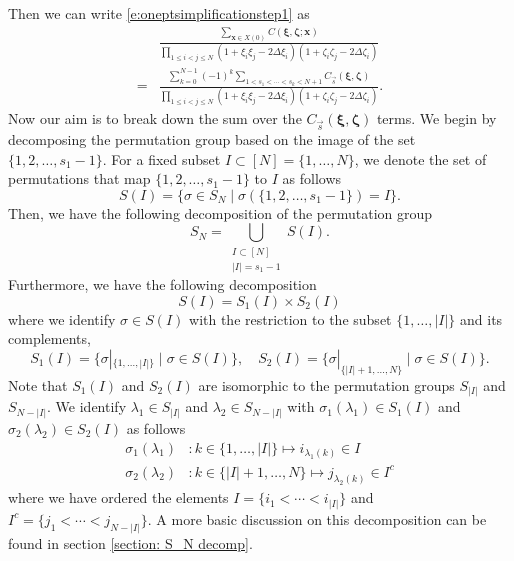 \documentclass[a4paper,11pt]{article}
\theoremstyle{definition}
\begin{document}
Then we can write \eqref{e:oneptsimplificationstep1} as 
\begin{equation}\label{e:oneptsimplificationstep2}
\begin{split}
    &\frac{\sum_{\mathbf{x} \in X(0)}C(\boldsymbol{\xi}, \boldsymbol{\zeta}; \mathbf{x})}{\prod_{1 \leq i <j \leq N}(1 + \xi_i \xi_j - 2 \Delta \xi_i)(1 + \zeta_i \zeta_j - 2 \Delta \zeta_i)}\\
    =&\frac{\sum_{k=0}^{N-1}(-1)^k \sum_{1< s_1 < \cdots < s_k < N+1}C_{\vec{s}}(\boldsymbol{\xi}, \boldsymbol{\zeta})}{\prod_{1 \leq i <j \leq N}(1 + \xi_i \xi_j - 2 \Delta \xi_i)(1 + \zeta_i \zeta_j - 2 \Delta \zeta_i)}.
\end{split}
\end{equation}
Now our aim is to break down the sum over the $C_{\vec{s}}(\boldsymbol{\xi},\boldsymbol{\zeta})$ terms.
We begin by decomposing the permutation group based on the image of the set $\{1,2, \dots, s_1-1\}$. For a fixed subset $I \subset [N]=\{1,\ldots,N\}$, we denote the set of permutations that map $\{1,2, \dots, s_1-1\}$ to $I$ as follows
\begin{equation}
    S(I) = \{\sigma \in S_N  \mid \sigma(\{1, 2, \dots, s_1-1 \}) =I\}.
\end{equation}
Then, we have the following decomposition of the permutation group
\begin{equation}\label{e:decomp1}
    S_{N} = \bigcup_{\substack{I \subset [N]\\|I|=s_1-1}} S(I).
\end{equation}
Furthermore, we have the following decomposition
\begin{equation}\label{e:decomp2}
    S(I) = S_1(I) \times S_2(I)
\end{equation}
where we identify $\sigma \in S(I)$ with the restriction to the subset $\{1, \dots, |I|\}$ and its complements,
\begin{equation}
    S_1(I) = \{\sigma|_{\{1, \dots, |I|\}} \mid \sigma\in S(I) \}, \quad S_2(I) = \{\sigma|_{\{|I|+1, \dots, N\}} \mid \sigma\in S(I) \}.
\end{equation}
Note that $S_1(I)$ and $S_2(I)$ are isomorphic to the permutation groups $S_{|I|}$ and $S_{N-|I|}$. We identify $\lambda_1 \in S_{|I|}$ and $\lambda_2 \in S_{N-|I|}$ with $\sigma_1(\lambda_1) \in S_1(I)$ and $\sigma_2(\lambda_2) \in S_2(I)$ as follows
\begin{equation}\label{e:per_decomp}
\begin{split}
\sigma_1(\lambda_1)&: k \in \{1, \dots, |I|\} \mapsto i_{\lambda_1(k)} \in I\\
\sigma_2(\lambda_2)&: k\in \{|I|+1, \dots, N\} \mapsto j_{\lambda_2(k)} \in I^c
\end{split}
\end{equation}
where we have ordered the elements $I = \{ i_1 < \cdots < i_{|I|}\}$ and $I^c = \{ j_1 < \cdots< j_{N-|I|}\}$. A more basic discussion on this decomposition can be found in section \eqref{section: S_N decomp}.
\end{document}
